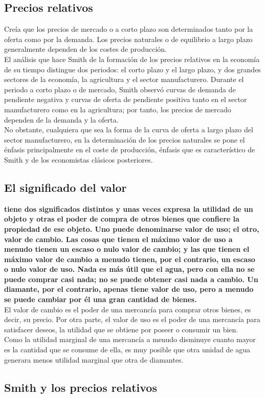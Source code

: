 \documentclass[10pt]{book}
\begin{document}
\subsection*{Precios relativos}
Creía que los precios de mercado o a corto plazo son determinados tanto por la
oferta como por la demanda. Los precios naturales o de equilibrio a largo plazo generalmente dependen de los costes de producción.\\
El análisis que hace Smith de la formación de los precios relativos en la economía de su tiempo distingue dos periodos: el corto plazo y el largo plazo, y dos grandes sectores de la economía, la agricultura y el sector manufacturero. Durante el periodo a corto plazo o de mercado, Smith observó curvas de demanda de pendiente negativa y curvas de oferta de pendiente positiva tanto en el sector manufacturero como en la agricultura; por tanto, los precios de mercado dependen de la demanda y la oferta.\\
No obstante, cualquiera que sea la forma de la curva de oferta a largo plazo del sector manufacturero, en la determinación de los precios naturales se pone el énfasis principalmente en el coste de producción, énfasis que es característico de Smith y de los economistas clásicos posteriores.\\

\subsection*{El significado del valor}
\textbf{tiene dos significados distintos y unas veces expresa la utilidad de un objeto y otras el poder de compra de otros bienes que confiere la propiedad de ese objeto. Uno puede denominarse valor de uso; el otro, valor de cambio. Las cosas que tienen el máximo valor de uso a menudo tienen un escaso o nulo valor de cambio; y las que tienen el máximo valor de cambio a menudo tienen, por el contrario, un escaso o nulo valor de uso. Nada es más útil que el agua, pero con ella no se puede comprar casi nada; no se puede obtener casi nada a cambio. Un diamante, por el contrario, apenas tiene valor de uso, pero a menudo se puede cambiar por él una gran cantidad de bienes.}\\
El valor de cambio es el poder de una mercancía para comprar otros bienes, es decir, su precio. Por otra parte, el valor de uso es el poder de una mercancía para satisfacer deseos, la utilidad que se obtiene por poseer o consumir un bien.\\
Como la utilidad marginal de una mercancía a menudo disminuye cuanto mayor es la cantidad que se consume de ella, es muy posible que otra unidad de agua generara menos utilidad marginal que otra de diamantes.\\

\subsection*{Smith y los precios relativos}
\end{document}
